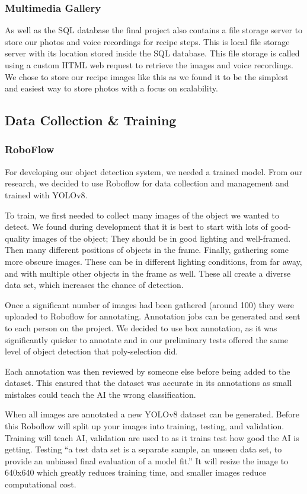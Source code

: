 \documentclass{article}
\begin{document}
    \subsubsection{Multimedia Gallery}
    As well as the SQL database the final project also contains a file storage server to store our photos and voice recordings for recipe steps. This is local file storage server with its location stored inside the SQL database.
    This file storage is called using a custom HTML web request to retrieve the images and voice recordings. We chose to store our recipe images like this as we found it to be the simplest and easiest way to store photos with a focus on scalability.

    \subsection{Data Collection \& Training}
    \subsubsection{RoboFlow}
    For developing our object detection system, we needed a trained model. From our research, we decided to use Roboflow for data collection and management and trained with YOLOv8.
    
To train, we first needed to collect many images of the object we wanted to detect. We found during development that it is best to start with lots of good-quality images of the object; They should be in good lighting and well-framed. Then many different positions of objects in the frame. Finally, gathering some more obscure images. These can be in different lighting conditions, from far away, and with multiple other objects in the frame as well. These all create a diverse data set, which increases the chance of detection.

Once a significant number of images had been gathered (around 100) they were uploaded to Roboflow for annotating. Annotation jobs can be generated and sent to each person on the project. We decided to use box annotation, as it was significantly quicker to annotate and in our preliminary tests offered the same level of object detection that poly-selection did.

Each annotation was then reviewed by someone else before being added to the dataset. This ensured that the dataset was accurate in its annotations as small mistakes could teach the AI the wrong classification.

When all images are annotated a new YOLOv8 dataset can be generated. Before this Roboflow will split up your images into training, testing, and validation. Training will teach AI, validation are used to as it trains test how good the AI is getting. Testing “a test data set is a separate sample, an unseen data set, to provide an unbiased final evaluation of a model fit.” \cite{trainvalidtest} It will resize the image to 640x640 which greatly reduces training time, and smaller images reduce computational cost. 
\end{document}
